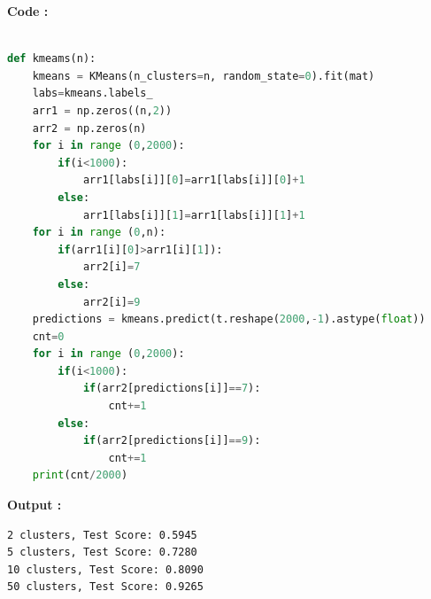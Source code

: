 \documentclass[a4paper, 11pt]{article}
\begin{document}
\textbf{Code :}
\begin{lstlisting}[language=Python]

def kmeams(n):
    kmeans = KMeans(n_clusters=n, random_state=0).fit(mat)
    labs=kmeans.labels_
    arr1 = np.zeros((n,2))
    arr2 = np.zeros(n)
    for i in range (0,2000):
        if(i<1000):
            arr1[labs[i]][0]=arr1[labs[i]][0]+1
        else:
            arr1[labs[i]][1]=arr1[labs[i]][1]+1
    for i in range (0,n):
        if(arr1[i][0]>arr1[i][1]):
            arr2[i]=7
        else:
            arr2[i]=9
    predictions = kmeans.predict(t.reshape(2000,-1).astype(float))
    cnt=0
    for i in range (0,2000):
        if(i<1000):
            if(arr2[predictions[i]]==7):
                cnt+=1
        else:
            if(arr2[predictions[i]]==9):
                cnt+=1
    print(cnt/2000)
\end{lstlisting}

\textbf{Output :}
\begin{verbatim}
2 clusters, Test Score: 0.5945
5 clusters, Test Score: 0.7280
10 clusters, Test Score: 0.8090
50 clusters, Test Score: 0.9265
\end{verbatim}
\end{document}
